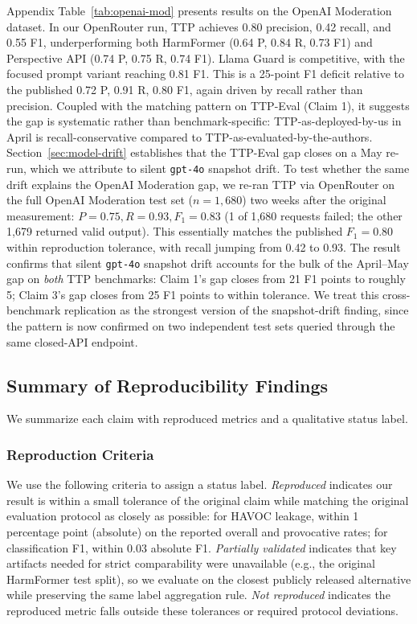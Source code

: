 \documentclass[10pt]{article} %
\begin{document}
Appendix Table~\ref{tab:openai-mod} presents results on the OpenAI Moderation dataset. In our OpenRouter run, TTP achieves 0.80 precision, 0.42 recall, and 0.55 F1, underperforming both HarmFormer (0.64 P, 0.84 R, 0.73 F1) and Perspective API (0.74 P, 0.75 R, 0.74 F1). Llama Guard is competitive, with the focused prompt variant reaching 0.81 F1.
This is a 25-point F1 deficit relative to the published 0.72 P, 0.91 R, 0.80 F1, again driven by recall rather than precision. Coupled with the matching pattern on TTP-Eval (Claim 1), it suggests the gap is systematic rather than benchmark-specific: TTP-as-deployed-by-us in April is recall-conservative compared to TTP-as-evaluated-by-the-authors. Section~\ref{sec:model-drift} establishes that the TTP-Eval gap closes on a May re-run, which we attribute to silent \texttt{gpt-4o} snapshot drift. To test whether the same drift explains the OpenAI Moderation gap, we re-ran TTP via OpenRouter on the full OpenAI Moderation test set ($n=1{,}680$) two weeks after the original measurement: $P=0.75, R=0.93, F_1=0.83$ (1 of 1{,}680 requests failed; the other 1{,}679 returned valid output). This essentially matches the published $F_1=0.80$ within reproduction tolerance, with recall jumping from 0.42 to 0.93. The result confirms that silent \texttt{gpt-4o} snapshot drift accounts for the bulk of the April--May gap on \emph{both} TTP benchmarks: Claim 1's gap closes from 21 F1 points to roughly 5; Claim 3's gap closes from 25 F1 points to within tolerance. We treat this cross-benchmark replication as the strongest version of the snapshot-drift finding, since the pattern is now confirmed on two independent test sets queried through the same closed-API endpoint.

\subsection{Summary of Reproducibility Findings}
We summarize each claim with reproduced metrics and a qualitative status label.

\subsubsection{Reproduction Criteria}
We use the following criteria to assign a status label. \textit{Reproduced} indicates our result is within a small tolerance of the original claim while matching the original evaluation protocol as closely as possible: for HAVOC leakage, within 1 percentage point (absolute) on the reported overall and provocative rates; for classification F1, within 0.03 absolute F1. \textit{Partially validated} indicates that key artifacts needed for strict comparability were unavailable (e.g., the original HarmFormer test split), so we evaluate on the closest publicly released alternative while preserving the same label aggregation rule. \textit{Not reproduced} indicates the reproduced metric falls outside these tolerances or required protocol deviations.
\end{document}

